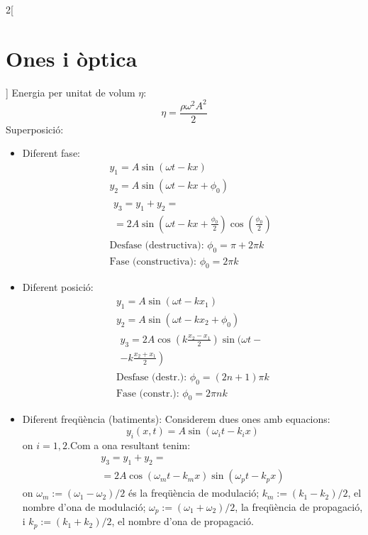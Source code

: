 \documentclass[../../../main.tex]{subfiles}
\begin{document}
\begin{multicols}{2}[\section{Ones i òptica}]
  Energia per unitat de volum $\eta$:
  $$\eta=\frac{\rho\omega^2A^2}{2}$$
  Superposició:
  \begin{itemize}
    \item Diferent fase:
          \begin{gather*}
            y_1=A\sin(\omega t- kx)\\
            y_2=A\sin(\omega t- kx+\phi_0)\\
            \begin{split}
              y_3=y_1+y_2=\qquad\qquad\qquad\qquad\\=2A\sin\left(\omega t-kx+\frac{\phi_0}{2}\right)\cos\left(\frac{\phi_0}{2}\right)
            \end{split}\\
            \text{Desfase (destructiva): }\phi_0=\pi+2\pi k\\
            \text{Fase (constructiva): }\phi_0=2\pi k
          \end{gather*}
    \item Diferent posició:
          \begin{gather*}
            y_1=A\sin(\omega t- kx_1)\\
            y_2=A\sin(\omega t- kx_2+\phi_0)\\
            \begin{split}
              y_3=2A\cos\left(k\frac{x_2-x_1}{2}\right)\sin\bigg(\omega t-\\\left.-k\frac{x_2+x_1}{2}\right)
            \end{split}\\
            \text{Desfase (destr.): }\phi_0=(2n+1)\pi k\\
            \text{Fase (constr.): }\phi_0=2\pi nk
          \end{gather*}
    \item Diferent freqüència (batiments):\newline
          Considerem dues ones amb equacions: $$y_i(x,t)=A\sin(\omega_it-k_ix)$$ {\footnotesize on $i=1,2$.}\newline Com a ona resultant tenim:
          \begin{multline*}
            y_3=y_1+y_2=\\=2A\cos(\omega_mt-k_mx)\sin(\omega_pt-k_px)
          \end{multline*}{\footnotesize on $\omega_m:=(\omega_1-\omega_2)/2$ és la freqüència de modulació; $k_m:=(k_1-k_2)/2$, el nombre d'ona de modulació; $\omega_p:=(\omega_1+\omega_2)/2$, la freqüència de propagació, i $k_p:=(k_1+k_2)/2$, el nombre d'ona de propagació.}\newline

\end{itemize}
\end{multicols}
\end{document}
